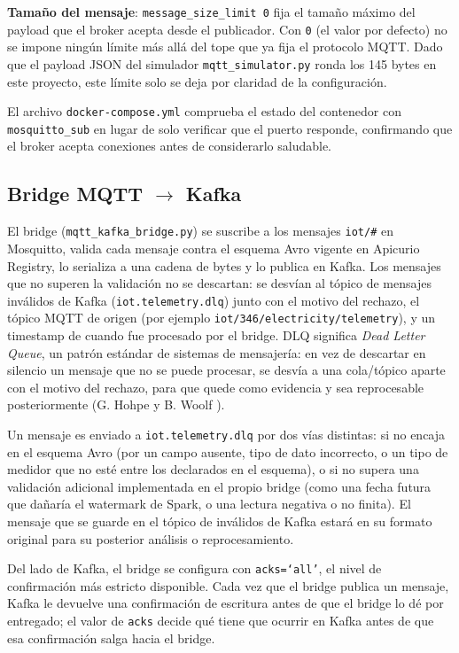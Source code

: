 \textbf{Tamaño del mensaje}: \texttt{message\_size\_limit 0} fija el tamaño máximo del payload que el broker acepta desde el publicador. Con \texttt{0} (el valor por defecto) no se impone ningún límite más allá del tope que ya fija el protocolo MQTT. Dado que el payload JSON del simulador \texttt{mqtt\_simulator.py} ronda los 145 bytes en este proyecto, este límite solo se deja por claridad de la configuración.

El archivo \texttt{docker-compose.yml} comprueba el estado del contenedor con \texttt{mosquitto\_sub} en lugar de solo verificar que el puerto responde, confirmando que el broker acepta conexiones antes de considerarlo saludable.

\subsection{Bridge MQTT \(\to\) Kafka}
\label{sec:bridge-mqtt-kafka}

El bridge (\texttt{mqtt\_kafka\_bridge.py}) se suscribe a los mensajes \texttt{iot/\#} en Mosquitto, valida cada mensaje contra el esquema Avro vigente en Apicurio Registry, lo serializa a una cadena de bytes y lo publica en Kafka. Los mensajes que no superen la validación no se descartan: se desvían al tópico de mensajes inválidos de Kafka (\texttt{iot.telemetry.dlq}) junto con el motivo del rechazo, el tópico MQTT de origen (por ejemplo \texttt{iot/346/electricity/telemetry}), y un timestamp de cuando fue procesado por el bridge. DLQ significa \textit{Dead Letter Queue}, un patrón estándar de sistemas de mensajería: en vez de descartar en silencio un mensaje que no se puede procesar, se desvía a una cola/tópico aparte con el motivo del rechazo, para que quede como evidencia y sea reprocesable posteriormente (G. Hohpe y B. Woolf \cite{hohpewoolf2003}).

Un mensaje es enviado a \texttt{iot.telemetry.dlq} por dos vías distintas: si no encaja en el esquema Avro (por un campo ausente, tipo de dato incorrecto, o un tipo de medidor que no esté entre los declarados en el esquema), o si no supera una validación adicional implementada en el propio bridge (como una fecha futura que dañaría el watermark de Spark, o una lectura negativa o no finita). El mensaje que se guarde en el tópico de inválidos de Kafka estará en su formato original para su posterior análisis o reprocesamiento.

Del lado de Kafka, el bridge se configura con \texttt{acks=`all'}, el nivel de confirmación más estricto disponible. Cada vez que el bridge publica un mensaje, Kafka le devuelve una confirmación de escritura antes de que el bridge lo dé por entregado; el valor de \texttt{acks} decide qué tiene que ocurrir en Kafka antes de que esa confirmación salga hacia el bridge.

